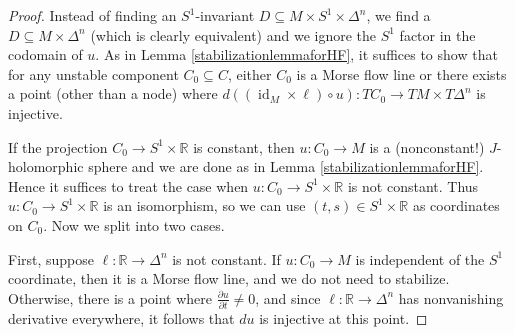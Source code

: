 \documentclass[12pt]{article}
\theoremstyle{definition}
\theoremstyle{remark}
\numberwithin{equation}{subsection}
\newcommand{\RR}{\mathbb R}
\newcommand{\id}{\operatorname{id}}
\begin{document}
\begin{proof}
Instead of finding an $S^1$-invariant $D\subseteq M\times S^1\times\Delta^n$, we find a $D\subseteq M\times\Delta^n$ (which is clearly equivalent) and we ignore the $S^1$ factor in the codomain of $u$.  As in Lemma \ref{stabilizationlemmaforHF}, it suffices to show that for any unstable component $C_0\subseteq C$, either $C_0$ is a Morse flow line or there exists a point (other than a node) where $d((\id_M\times\ell)\circ u):TC_0\to TM\times T\Delta^n$ is injective.

If the projection $C_0\to S^1\times\RR$ is constant, then $u:C_0\to M$ is a (nonconstant!) $J$-holomorphic sphere and we are done as in Lemma \ref{stabilizationlemmaforHF}.  Hence it suffices to treat the case when $u:C_0\to S^1\times\RR$ is not constant.  Thus $u:C_0\to S^1\times\RR$ is an isomorphism, so we can use $(t,s)\in S^1\times\RR$ as coordinates on $C_0$.  Now we split into two cases.

First, suppose $\ell:\RR\to\Delta^n$ is not constant.  If $u:C_0\to M$ is independent of the $S^1$ coordinate, then it is a Morse flow line, and we do not need to stabilize.  Otherwise, there is a point where $\frac{\partial u}{\partial t}\ne 0$, and since $\ell:\RR\to\Delta^n$ has nonvanishing derivative everywhere, it follows that $du$ is injective at this point.


\end{proof}
\end{document}
